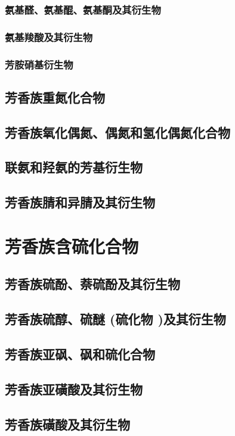 \documentclass[UTF8]{../03-Chemistry}
\begin{document}
        \subsubsection{氨基醛、氨基醌、氨基酮及其衍生物}
        \subsubsection{氨基羧酸及其衍生物}
        \subsubsection{芳胺硝基衍生物}
    \subsection{芳香族重氮化合物}
    \subsection{芳香族氧化偶氮、偶氮和氢化偶氮化合物}
    \subsection{联氨和羟氨的芳基衍生物}
    \subsection{芳香族腈和异腈及其衍生物}
\section{芳香族含硫化合物}
    \subsection{芳香族硫酚、萘硫酚及其衍生物}
    \subsection{芳香族硫醇、硫醚 (硫化物 )及其衍生物}
    \subsection{芳香族亚砜、砜和硫化合物}
    \subsection{芳香族亚磺酸及其衍生物}
    \subsection{芳香族磺酸及其衍生物}
\end{document}
